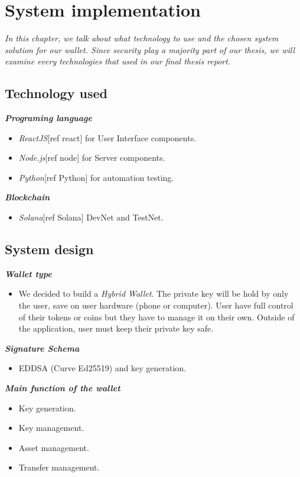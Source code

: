 \chapter{System implementation} \label{chap:System_implementation}
\textit{In this chapter, we talk about what technology to use and the chosen system solution for our wallet. Since security play a majority part of our thesis, we will examine every technologies that used in our final thesis report.}
\minitoc

\section{Technology used}
{\textit {\textbf{Programing language}}}
\begin{itemize}
\item \emph{ReactJS}[ref react] for User Interface components. 
\item \emph{Node.js}[ref node] for Server components. 
\item \emph{Python}[ref Python] for automation testing.
\end{itemize}

{\textit {\textbf{Blockchain}}}
\begin{itemize}
    \item \emph{Solana}[ref Solana] DevNet and TestNet. 
\end{itemize}

\section{System design}
{\textit {\textbf{Wallet type}}}
\begin{itemize}
    \item We decided to build a \emph{Hybrid Wallet}. 
    The private key will be hold by only the user, save on user hardware (phone or computer).
    User have full control of their tokens or coins but they have to manage it on their own.
    Outside of the application, user must keep their private key safe.
\end{itemize}

{\textit {\textbf{Signature Schema}}}
\begin{itemize}
    \item EDDSA (Curve Ed25519) and key generation.
\end{itemize}

{\textit {\textbf{Main function of the wallet}}}
\begin{itemize}
    \item Key generation.
    \item Key management.
    \item Asset management.
    \item Transfer management.
\end{itemize}